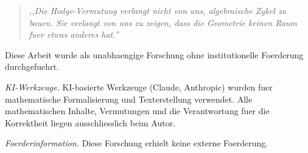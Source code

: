 \documentclass[aps,prd,twocolumn,superscriptaddress,nofootinbib]{revtex4-2}
\theoremstyle{definition}
\theoremstyle{remark}
\begin{document}
\begin{quote}
\textit{,,Die Hodge-Vermutung verlangt nicht von uns, algebraische Zykel zu bauen. Sie verlangt von uns zu zeigen, dass die Geometrie keinen Raum fuer etwas anderes hat.''}
\end{quote}


\begin{acknowledgments}
Diese Arbeit wurde als unabhaengige Forschung ohne institutionelle Foerderung durchgefuehrt.

\textit{KI-Werkzeuge.} KI-basierte Werkzeuge (Claude, Anthropic) wurden fuer mathematische Formalisierung und Texterstellung verwendet. Alle mathematischen Inhalte, Vermutungen und die Verantwortung fuer die Korrektheit liegen ausschliesslich beim Autor.

\textit{Foerderinformation.} Diese Forschung erhielt keine externe Foerderung.
\end{acknowledgments}
\end{document}
